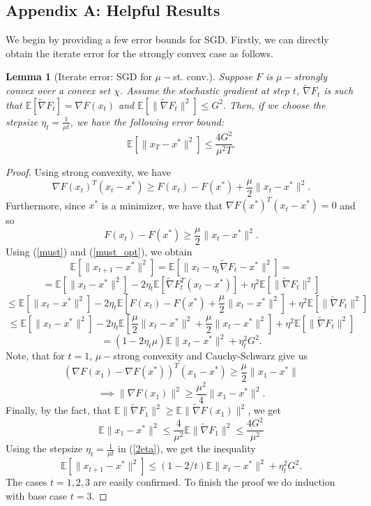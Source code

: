 \documentclass[11pt, twoside]{report}
\newtheorem{lemma}[theorem]{Lemma}
\begin{document}
\subsection*{Appendix A: Helpful Results}
\label{AppendixA}
We begin by providing a few error bounds for SGD. Firstly, we can directly obtain the iterate error for the strongly convex case as follows.
\begin{lemma}[Iterate error: SGD for $\mu-$st. conv.] \label{sgdmu}
    Suppose $F$ is $\mu-$strongly convex over a convex set $\chi$. Assume the stochastic gradient at step $t$, $\tilde{\nabla} F_t$ is such that $\mathbb{E}[\tilde{\nabla} F_t] = \nabla F(x_t)$ and $ \mathbb{E}[\|\tilde{\nabla} F_t\|^2] \leq G^2.$ Then, if we choose the stepsize $\eta_t = \frac{1}{\mu t}$, we have the following error bound:
    \[\mathbb{E}[\|x_T - x^*\|^2] \leq \frac{4G^2}{\mu^2 T}.\]
\end{lemma}
\begin{proof}
    Using strong convexity, we have
        \begin{equation} \label{must}
            \nabla F(x_t)^T(x_t - x^*) \geq F(x_t) - F(x^*) + \frac{\mu}{2}\|x_t - x^*\|^2.
        \end{equation}
        Furthermore, since $x^*$ is a minimizer, we have that $\nabla F(x^*)^T(x_t - x^*) = 0$ and so
        \begin{equation} \label{must_opt}
            F(x_t) - F(x^*) \geq \frac{\mu}{2}\|x_t - x^*\|^2.
        \end{equation}
        Using (\ref{must}) and (\ref{must_opt}), we obtain
        \[\mathbb{E}[\|x_{t+1} - x^*\|^2] = \mathbb{E}[\|x_t - \eta_t \tilde{\nabla} F_t - x^*\|^2] =\]
        \[=\mathbb{E}[\|x_{t} - x^*\|^2] - 2\eta_t \mathbb{E} \left[ \tilde{\nabla} F_t^T(x_t - x^*) \right] + \eta^2 \mathbb{E}[\|\tilde{\nabla} F_t\|^2] \]
        \[\leq \mathbb{E}[\|x_{t} - x^*\|^2] - 2\eta_t \mathbb{E} \left[F(x_t) - F(x^*) + \frac{\mu}{2}\|x_t - x^*\|^2 \right] + \eta^2 \mathbb{E}[\|\tilde{\nabla} F_t\|^2]\]
        \[\leq \mathbb{E}[\|x_{t} - x^*\|^2] - 2\eta_t \mathbb{E} \left[\frac{\mu}{2}\|x_t - x^*\|^2 + \frac{\mu}{2}\|x_t - x^*\|^2 \right] + \eta^2 \mathbb{E}[\|\tilde{\nabla} F_t\|^2] \]
        \begin{equation} \label{2eta}
            = (1-2\eta_t \mu) \mathbb{E}\|x_t - x^*\|^2 + \eta_t^2 G^2.
        \end{equation}
        Note, that for $t=1$, $\mu-$strong convexity and Cauchy-Schwarz give us
        \[(\nabla F(x_1) - \nabla F(x^*))^T(x_1-x^*) \geq \frac{\mu}{2}\|x_1 - x^*\|\]
        \[\implies \|\nabla F(x_1)\|^2 \geq \frac{\mu^2}{4}\|x_1 - x^*\|^2.\]
        Finally, by the fact, that $\mathbb{E}\|\tilde{\nabla}F_1\|^2 \geq \mathbb{E}\|\tilde{\nabla}F(x_1)\|^2$, we get
        \[\mathbb{E}\|x_1 - x^*\|^2 \leq \frac{4}{\mu^2} \mathbb{E}\|\tilde{\nabla}F_1\|^2 \leq \frac{4G^2}{\mu^2}\]
        Using the stepsize $\eta_t = \frac{1}{\mu t}$ in (\ref{2eta}), we get the inequality
        \[\mathbb{E}[\|x_{t+1} - x^*\|^2] \leq (1-2/t) \mathbb{E}\|x_t - x^*\|^2 + \eta_t^2 G^2.\]
        The cases $t=1,2,3$ are easily confirmed. To finish the proof we do induction with base case $t=3$.
\end{proof}
\end{document}
